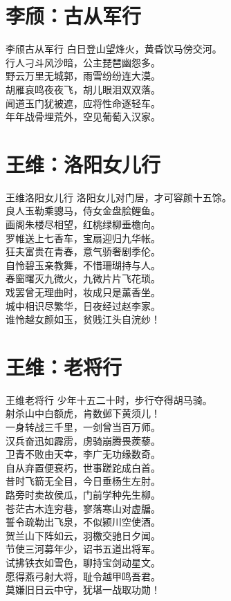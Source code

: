 \documentclass[12pt,oneside,a5paper]{book}
\begin{document}
\chapter{李颀：古从军行}
\begin{poemzh}{李颀}{古从军行}
白日登山望烽火，黄昏饮马傍交河。\\
行人刁斗风沙暗，公主琵琶幽怨多。\\
野云万里无城郭，雨雪纷纷连大漠。\\
胡雁哀鸣夜夜飞，胡儿眼泪双双落。\\
闻道玉门犹被遮，应将性命逐轻车。\\
年年战骨埋荒外，空见葡萄入汉家。\\ 
\end{poemzh}

\chapter{王维：洛阳女儿行}
\begin{poemzh}{王维}{洛阳女儿行}
洛阳女儿对门居，才可容颜十五馀。\\
良人玉勒乘骢马，侍女金盘脍鲤鱼。\\
画阁朱楼尽相望，红桃绿柳垂檐向。\\
罗帷送上七香车，宝扇迎归九华帐。\\
狂夫富贵在青春，意气骄奢剧季伦。\\
自怜碧玉亲教舞，不惜珊瑚持与人。\\
春窗曙灭九微火，九微片片飞花琐。\\
戏罢曾无理曲时，妆成只是薰香坐。\\
城中相识尽繁华，日夜经过赵李家。\\
谁怜越女颜如玉，贫贱江头自浣纱！\\ 
\end{poemzh}

\chapter{王维：老将行}
\begin{poemzh}{王维}{老将行}
少年十五二十时，步行夺得胡马骑。\\
射杀山中白额虎，肯数邺下黄须儿！\\
一身转战三千里，一剑曾当百万师。\\
汉兵奋迅如霹雳，虏骑崩腾畏蒺藜。\\
卫青不败由天幸，李广无功缘数奇。\\
自从弃置便衰朽，世事蹉跎成白首。\\
昔时飞箭无全目，今日垂杨生左肘。\\
路旁时卖故侯瓜，门前学种先生柳。\\
苍茫古木连穷巷，寥落寒山对虚牖。\\
誓令疏勒出飞泉，不似颍川空使酒。\\
贺兰山下阵如云，羽檄交驰日夕闻。\\
节使三河募年少，诏书五道出将军。\\
试拂铁衣如雪色，聊持宝剑动星文。\\
愿得燕弓射大将，耻令越甲鸣吾君。\\
莫嫌旧日云中守，犹堪一战取功勋！\\ 
\end{poemzh}
\end{document}
